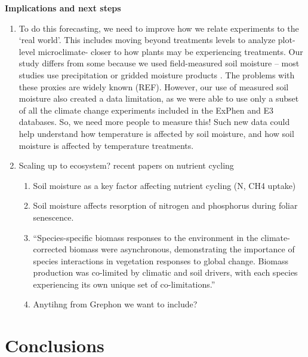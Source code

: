 \documentclass{article}
\begin{document}
\textbf {Implications and next steps}
\begin{enumerate}
\item To do this forecasting, we need to improve how we relate experiments to the `real world'. This includes moving beyond treatments levels to analyze plot-level microclimate- closer to how plants may be experiencing treatments. Our study differs from some because we used field-measured soil moisture -- most studies use precipitation \citep[e.g.,][]{tao2020} or gridded moisture products \citep[e.g.,][]{tao2019}. The problems with these proxies are widely known (REF). However, our use of measured soil moisture also created a data limitation, as we were able to use only a subset of all the climate change experiments included in the ExPhen and E3 databases. So, we need more people to measure this! Such new data could help understand how temperature is affected by soil moisture, and how soil moisture is affected by temperature treatments.
\item  Scaling up to ecosystem? recent papers on nutrient cycling
\begin{enumerate}
\item Soil moisture as a key factor affecting nutrient cycling (N, CH4 uptake)\citep{liu2019soil}
\item Soil moisture affects resorption of nitrogen and phosphorus during foliar senescence\citep{estiarte2022}.
\item ``Species-specific biomass responses to the environment in the climate-corrected biomass were asynchronous, demonstrating the importance of species interactions in vegetation responses to global change. Biomass production was co-limited by climatic and soil drivers, with each species experiencing its own unique set of co-limitations.'' \citep{wilfahrt2021}
\item Anytihng from Grephon we want to include?
\end{enumerate}

\end{enumerate}
\section* {Conclusions}
\end{document}
